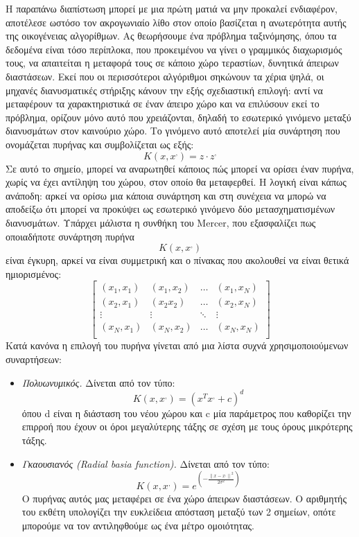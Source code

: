 \documentclass{article}
\newcommand{\norm}[1]{\left\lVert#1\right\rVert}
\begin{document}
Η παραπάνω διαπίστωση μπορεί με μια πρώτη ματιά να μην προκαλεί ενδιαφέρον, αποτέλεσε ωστόσο τον ακρογωνιαίο λίθο στον οποίο βασίζεται η ανωτερότητα αυτής της οικογένειας αλγορίθμων. Ας θεωρήσουμε ένα πρόβλημα ταξινόμησης, όπου τα δεδομένα είναι τόσο περίπλοκα, που προκειμένου να γίνει ο γραμμικός διαχωρισμός τους, να απαιτείται η μεταφορά τους σε κάποιο χώρο τεραστίων, δυνητικά άπειρων διαστάσεων. Εκεί που οι περισσότεροι αλγόριθμοι σηκώνουν τα χέρια ψηλά, οι μηχανές διανυσματικές στήριξης κάνουν την εξής σχεδιαστική επιλογή: αντί να μεταφέρουν τα χαρακτηριστικά σε έναν άπειρο χώρο και να επιλύσουν εκεί το πρόβλημα, ορίζουν μόνο αυτό που χρειάζονται, δηλαδή το εσωτερικό γινόμενο μεταξύ διανυσμάτων στον καινούριο χώρο. Το γινόμενο αυτό αποτελεί μία συνάρτηση που ονομάζεται πυρήνας και συμβολίζεται ως εξής: 
$$K(x, x^,)= z \cdot z^,$$
Σε αυτό το σημείο, μπορεί να αναρωτηθεί κάποιος πώς μπορεί να ορίσει έναν πυρήνα, χωρίς να έχει αντίληψη του χώρου, στον οποίο θα μεταφερθεί. Η λογική είναι κάπως ανάποδη: αρκεί να ορίσω μια κάποια συνάρτηση και στη συνέχεια να μπορώ να αποδείξω ότι μπορεί να προκύψει ως εσωτερικό γινόμενο δύο μετασχηματισμένων διανυσμάτων. Υπάρχει μάλιστα η συνθήκη του Mercer, που εξασφαλίζει πως οποιαδήποτε συνάρτηση πυρήνα
$$K(x, x^,)$$
είναι έγκυρη, αρκεί να είναι συμμετρική και ο πίνακας που ακολουθεί να είναι θετικά ημιορισμένος:
 \[
\begin{bmatrix}
    (x_1, x_1) &  (x_1, x_2)  & \dots  &   (x_1, x_N) \\
     (x_2, x_1) &  (x_2 x_2)  & \dots  &   (x_2, x_N) \\
    \vdots  & \vdots &\ddots & \vdots \\
    (x_N, x_1) &  (x_N, x_2)  & \dots  &   (x_N, x_N) \\
\end{bmatrix}
\]
Κατά κανόνα η επιλογή του πυρήνα γίνεται από μια λίστα συχνά χρησιμοποιούμενων συναρτήσεων:
\begin{itemize}
\item \textit{Πολυωνυμικός.} Δίνεται από τον τύπο:
$$K(x, x^,)= (x^T x^, + c)^d$$
όπου d είναι η διάσταση του νέου χώρου και c μία παράμετρος που καθορίζει την επιρροή που έχουν οι όροι μεγαλύτερης τάξης σε σχέση με τους όρους μικρότερης τάξης.
\item \textit{Γκαουσιανός (Radial basia function).} Δίνεται από τον τύπο:
$$K(x, x^,)= e^{(-\frac{\norm{x-x^,}^2}{2 \sigma ^2})}$$
Ο πυρήνας αυτός μας μεταφέρει σε ένα χώρο άπειρων διαστάσεων. Ο αριθμητής του εκθέτη υπολογίζει την ευκλείδεια απόσταση μεταξύ των 2 σημείων, οπότε μπορούμε να τον αντιληφθούμε ως ένα μέτρο ομοιότητας.
\end{itemize}
\end{document}
